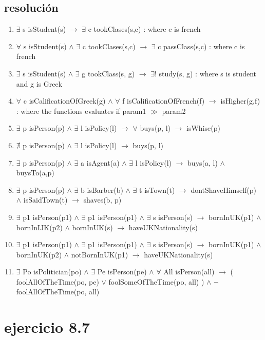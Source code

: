 \documentclass[a4paper,10pt]{article}
\begin{document}
\subsection{resolución}
\begin{enumerate}
	\item $\exists$ s isStudent(s) $\rightarrow$ $\exists$ c tookClases(s,c) : where c is french
	\item $\forall$ s isStudent(s) $\land$ $\exists$ c tookClases(s,c) $\rightarrow$ $\exists$ c passClass(s,c) : where c is french
	\item $\exists$ s isStudent(s) $\land$ $\exists$ g tookClass(s, g) $\rightarrow$ $\exists!$ study(s, g) : where s is student and g is Greek
	\item $\forall$ c isCalificationOfGreek(g) $\land$ $\forall$ f isCalificationOfFrench(f) $\rightarrow$ isHigher(g,f) : where the functions evaluates if param1 $\gg$ param2
	\item $\exists$ p isPerson(p) $\land$ $\exists$ l isPolicy(l) $\rightarrow$ $\forall$ buys(p, l) $\rightarrow$ isWhise(p)
	\item $\nexists$ p isPerson(p) $\land$ $\exists$ l isPolicy(l) $\rightarrow$ buys(p, l)
	\item $\exists$ p isPerson(p) $\land$ $\exists$ a isAgent(a) $\land$ $\exists$ l isPolicy(l) $\rightarrow$ buys(a, l) $\land$ buysTo(a,p)
	\item $\exists$ p isPerson(p) $\land$ $\exists$ b isBarber(b) $\land$ $\exists$ t isTown(t) $\rightarrow$ dontShaveHimself(p) $\land$ isSaidTown(t) $\rightarrow$ shaves(b, p)
	\item $\exists$ p1 isPerson(p1) $\land$ $\exists$ p1 isPerson(p1) $\land$ $\exists$ s isPerson(s) $\rightarrow$ bornInUK(p1) $\land$ bornInIJK(p2) $\land$ bornInUK(s) $\rightarrow$ haveUKNationality(s)
	\item $\exists$ p1 isPerson(p1) $\land$ $\exists$ p1 isPerson(p1) $\land$ $\exists$ s isPerson(s) $\rightarrow$ bornInUK(p1) $\land$ bornInUK(p2) $\land$ notBornInUK(p1) $\rightarrow$ haveUKNationality(s)
	\item $\exists$ Po isPolitician(po) $\land$ $\exists$ Pe isPerson(pe) $\land$ $\forall$ All isPerson(all) $\rightarrow$ ( foolAllOfTheTime(po, pe) $\lor$ foolSomeOfTheTime(po, all) ) $\land$ $\lnot$ foolAllOfTheTime(po, all)
\end{enumerate}

\section{ejercicio 8.7}
\end{document}
